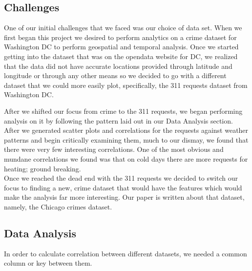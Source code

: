 \documentclass[a4paper,10pt]{article}
\begin{document}
\subsection{Challenges}
One of our initial challenges that we faced was our choice of data set. When we first began this project we desired to perform analytics on a crime dataset for Washington DC to perform geospatial and temporal analysis. Once we started getting into the dataset that was on the opendata website for DC, we realized that the data did not have accurate locations provided through latitude and longitude or through any other means so we decided to go with a different dataset that we could more easily plot, specifically, the 311 requests dataset from Washington DC.

After we shifted our focus from crime to the 311 requests, we began performing analysis on it by following the pattern laid out in our Data Analysis section. After we generated scatter plots and correlations for the requests against weather patterns and begin critically examining them, much to our dismay, we found that there were very few interesting correlations. One of the most obvious and mundane correlations we found was that on cold days there are more requests for heating; ground breaking.\\

Once we reached the dead end with the 311 requests we decided to switch our focus to finding a new, crime dataset that would have the features which would make the analysis far more interesting. Our paper is written about that dataset, namely, the Chicago crimes dataset.

\subsection{Data Analysis}
In order to calculate correlation between different datasets, we needed a common column or key between them.
\end{document}
